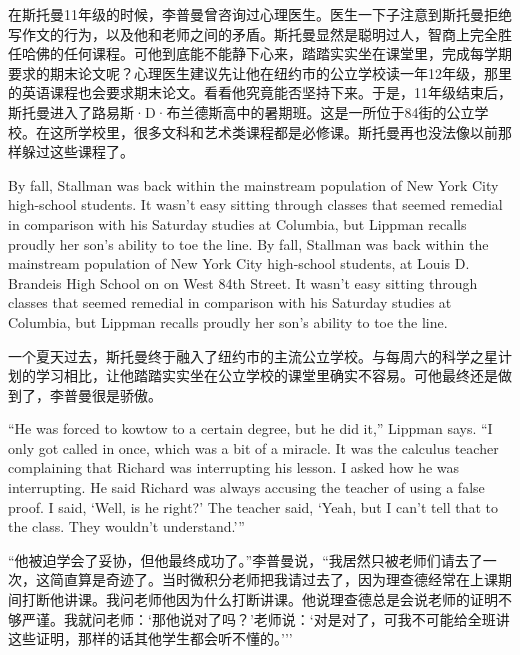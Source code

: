 \ifdefined\chs
在斯托曼11年级的时候，李普曼曾咨询过心理医生。医生一下子注意到斯托曼拒绝写作文的行为，以及他和老师之间的矛盾。斯托曼显然是聪明过人，智商上完全胜任哈佛的任何课程。可他到底能不能静下心来，踏踏实实坐在课堂里，完成每学期要求的期末论文呢？心理医生建议先让他在纽约市的公立学校读一年12年级，那里的英语课程也会要求期末论文。看看他究竟能否坚持下来。于是，11年级结束后，斯托曼进入了路易斯·D·布兰德斯高中的暑期班。这是一所位于84街的公立学校。在这所学校里，很多文科和艺术类课程都是必修课。斯托曼再也没法像以前那样躲过这些课程了。
\fi

\ifdefined\eng
\ifdefined\vone
By fall, Stallman was back within the mainstream population of New York City high-school students. It wasn't easy sitting through classes that seemed remedial in comparison with his Saturday studies at Columbia, but Lippman recalls proudly her son's ability to toe the line.
\fi
\ifdefined\vtwo
By fall, Stallman was back within the mainstream population of New York City high-school students, at Louis D. Brandeis High School on on West 84th Street. It wasn't easy sitting through classes that seemed remedial in comparison with his Saturday studies at Columbia, but Lippman recalls proudly her son's ability to toe the line.
\fi
\fi

\ifdefined\chs
一个夏天过去，斯托曼终于融入了纽约市的主流公立学校。与每周六的科学之星计划的学习相比，让他踏踏实实坐在公立学校的课堂里确实不容易。可他最终还是做到了，李普曼很是骄傲。
\fi

\ifdefined\eng
``He was forced to kowtow to a certain degree, but he did it,'' Lippman says. ``I only got called in once, which was a bit of a miracle. It was the calculus teacher complaining that Richard was interrupting his lesson. I asked how he was interrupting. He said Richard was always accusing the teacher of using a false proof. I said, `Well, is he right?' The teacher said, `Yeah, but I can't tell that to the class. They wouldn't understand.'\hspace{0.01in}''
\fi

\ifdefined\chs
``他被迫学会了妥协，但他最终成功了。''李普曼说，``我居然只被老师们请去了一次，这简直算是奇迹了。当时微积分老师把我请过去了，因为理查德经常在上课期间打断他讲课。我问老师他因为什么打断讲课。他说理查德总是会说老师的证明不够严谨。我就问老师：`那他说对了吗？'老师说：`对是对了，可我不可能给全班讲这些证明，那样的话其他学生都会听不懂的。'\hspace{0.01in}''
\fi

